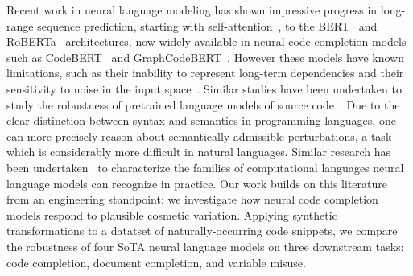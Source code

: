 \documentclass[usenames,dvipsnames]{article} %
\begin{document}
 Recent work in neural language modeling has shown impressive progress in long-range sequence prediction, starting with self-attention~\citep{vaswani2017attention}, to the BERT~\citep{devlin2018bert} and RoBERTa~\citep{liu2019roberta} architectures, now widely available in neural code completion models such as CodeBERT~\citep{feng2020codebert} and GraphCodeBERT~\citep{guo2021graphcodebert}. However these models have known limitations, such as their inability to represent long-term dependencies and their sensitivity to noise in the input space~\cite{sun2020adv}. Similar studies have been undertaken to study the robustness of pretrained language models of source code~\citep{bielik2020adversarial, zhou2021adversarial}. Due to the clear distinction between syntax and semantics in programming languages, one can more precisely reason about semantically admissible perturbations, a task which is considerably more difficult in natural languages. Similar research has been undertaken~\citep{weiss2018practical, chirkova2020empirical, chen2021evaluating} to characterize the families of computational languages neural language models can recognize in practice. Our work builds on this literature from an engineering standpoint: we investigate how neural code completion models respond to plausible cosmetic variation. Applying synthetic transformations to a datatset of naturally-occurring code snippets, we compare the robustness of four SoTA neural language models on three downstream tasks: code completion, document completion, and variable misuse. %


\end{document}
